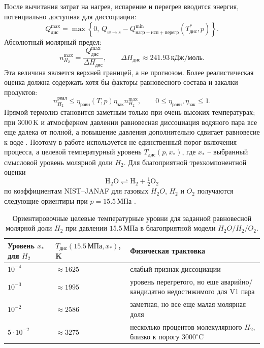 \documentclass[12pt]{article}
\begin{document}
После вычитания затрат на нагрев, испарение и перегрев вводится энергия, потенциально доступная для диссоциации:
\[
Q_{\mathrm{дис}}^{\max}=
\max\left\{0,\,
Q_{w\to s}
-Q_{\mathrm{нагр+исп+перегр}}^{\min}(T^*_{\mathrm{дис}},p)
\right\}.
\]
Абсолютный молярный предел:
\[
n_{H_2}^{\max}=
\frac{Q_{\mathrm{дис}}^{\max}}{\Delta H_{\mathrm{дис}}},
\qquad
\Delta H_{\mathrm{дис}}\approx241.93\,\mathrm{кДж/моль}.
\]
Эта величина является верхней границей, а не прогнозом. Более реалистическая оценка должна содержать хотя бы факторы равновесного состава и закалки продуктов:
\[
n_{H_2}^{\mathrm{реал}}\le
\eta_{\mathrm{равн}}(T,p)\eta_{\mathrm{зак}} n_{H_2}^{\max},
\qquad 0\le\eta_{\mathrm{равн}},\eta_{\mathrm{зак}}\le1.
\]
Прямой термолиз становится заметным только при очень высоких температурах; при \(3000\,\mathrm{K}\) и атмосферном давлении равновесная диссоциация водяного пара все еще далека от полной, а повышение давления дополнительно сдвигает равновесие к воде \cite{TsutsumiWaterSplitting}. Поэтому в работе используется не единственный порог включения процесса, а целевой температурный уровень \(T_{\mathrm{дис}}(p,x_*)\), где \(x_*\) -- выбранный смысловой уровень молярной доли \(H_2\). Для благоприятной трехкомпонентной оценки
\[
\mathrm{H_2O \rightleftharpoons H_2+\tfrac12 O_2}
\]
по коэффициентам NIST--JANAF для газовых \(H_2O\), \(H_2\) и \(O_2\) получаются следующие ориентиры при \(p=15.5\,\mathrm{МПа}\) \cite{NISTChemWebBook}.

\begin{table}[H]
    \centering
    \small
    \renewcommand{\arraystretch}{1.18}
    \begin{tabular}{|p{}|p{}|p{}|}
        \hline
        Уровень \(x_*\) для \(H_2\) & \(T_{\mathrm{дис}}(15.5\,\mathrm{МПа},x_*)\), K & Физическая трактовка\\
        \hline
        \(10^{-4}\) & \(\approx1625\) & слабый признак диссоциации\\
        \hline
        \(10^{-3}\) & \(\approx1995\) & уровень перегретого, но еще аварийно/кандидатно недостижимого для V1 пара\\
        \hline
        \(10^{-2}\) & \(\approx2586\) & заметная, но все еще малая молярная доля\\
        \hline
        \(5\cdot10^{-2}\) & \(\approx3275\) & несколько процентов молекулярного \(H_2\), близко к порогу \(3000^\circ\mathrm{C}\)\\
        \hline
    \end{tabular}
    \caption{Ориентировочные целевые температурные уровни для заданной равновесной молярной доли \(H_2\) при давлении \(15.5\,\mathrm{МПа}\) в благоприятной модели \(H_2O/H_2/O_2\).}
    \label{tab:dissociationTemperatureLevels}
\end{table}
\end{document}

